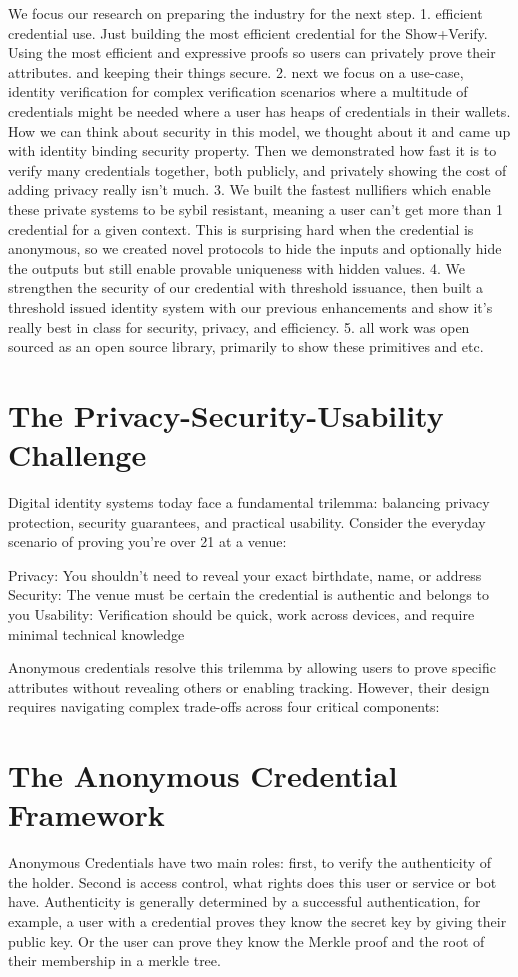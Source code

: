 We focus our research on preparing the industry for the next step.
1. efficient credential use. Just building the most efficient credential for the Show+Verify. Using the most efficient and expressive proofs so users can privately prove their attributes. and keeping their things secure.
2. next we focus on a use-case, identity verification for complex verification scenarios where a multitude of credentials might be needed where a user has heaps of credentials in their wallets. How we can think about security in this model, we thought about it and came up with identity binding security property. Then we demonstrated how fast it is to verify many credentials together, both publicly, and privately showing the cost of adding privacy really isn't much. 
3. We built the fastest nullifiers which enable these private systems to be sybil resistant, meaning a user can't get more than 1 credential for a given context. This is surprising hard when the credential is anonymous, so we created novel protocols to hide the inputs and optionally hide the outputs but still enable provable uniqueness with hidden values.
4. We strengthen the security of our credential with threshold issuance, then built a threshold issued identity system with our previous enhancements and show it's really best in class for security, privacy, and efficiency. 
5. all work was open sourced as an open source library, primarily to show these primitives and etc. 


\section{The Privacy-Security-Usability Challenge}
Digital identity systems today face a fundamental trilemma: balancing privacy protection, security guarantees, and practical usability. Consider the everyday scenario of proving you're over 21 at a venue:

Privacy: You shouldn't need to reveal your exact birthdate, name, or address
Security: The venue must be certain the credential is authentic and belongs to you
Usability: Verification should be quick, work across devices, and require minimal technical knowledge

Anonymous credentials resolve this trilemma by allowing users to prove specific attributes without revealing others or enabling tracking. However, their design requires navigating complex trade-offs across four critical components:

\section{The Anonymous Credential Framework}
Anonymous Credentials have two main roles: first, to verify the authenticity of the holder. Second is access control, what rights does this user or service or bot have. Authenticity is generally determined by a successful authentication, for example, a user with a credential proves they know the secret key by giving their public key. Or the user can prove they know the Merkle proof and the root of their membership in a merkle tree. 

